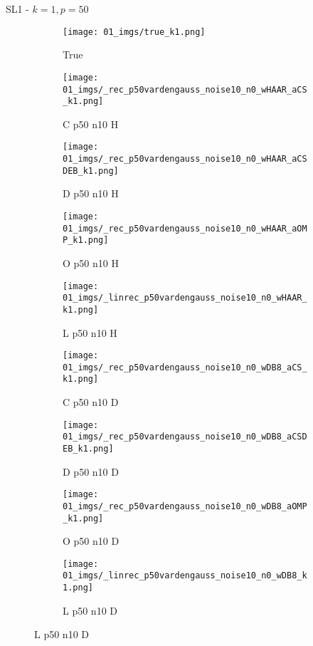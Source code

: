 \begin{frame}{SL1 - $k=1,p=50$}{}
\begin{figure}
\begin{subfigure}{0.1\textwidth}
\texttt{[image: 01\_imgs/true\_k1.png]}
\caption*{\Tiny True}
\end{subfigure}
\begin{subfigure}{0.1\textwidth}
\texttt{[image: 01\_imgs/\_rec\_p50vardengauss\_noise10\_n0\_wHAAR\_aCS\_k1.png]}
\caption*{\Tiny C p50 n10 H}
\end{subfigure}
\begin{subfigure}{0.1\textwidth}
\texttt{[image: 01\_imgs/\_rec\_p50vardengauss\_noise10\_n0\_wHAAR\_aCSDEB\_k1.png]}
\caption*{\Tiny D p50 n10 H}
\end{subfigure}
\begin{subfigure}{0.1\textwidth}
\texttt{[image: 01\_imgs/\_rec\_p50vardengauss\_noise10\_n0\_wHAAR\_aOMP\_k1.png]}
\caption*{\Tiny O p50 n10 H}
\end{subfigure}
\begin{subfigure}{0.1\textwidth}
\texttt{[image: 01\_imgs/\_linrec\_p50vardengauss\_noise10\_n0\_wHAAR\_k1.png]}
\caption*{\Tiny L p50 n10 H}
\end{subfigure}
\begin{subfigure}{0.1\textwidth}
\texttt{[image: 01\_imgs/\_rec\_p50vardengauss\_noise10\_n0\_wDB8\_aCS\_k1.png]}
\caption*{\Tiny C p50 n10 D}
\end{subfigure}
\begin{subfigure}{0.1\textwidth}
\texttt{[image: 01\_imgs/\_rec\_p50vardengauss\_noise10\_n0\_wDB8\_aCSDEB\_k1.png]}
\caption*{\Tiny D p50 n10 D}
\end{subfigure}
\begin{subfigure}{0.1\textwidth}
\texttt{[image: 01\_imgs/\_rec\_p50vardengauss\_noise10\_n0\_wDB8\_aOMP\_k1.png]}
\caption*{\Tiny O p50 n10 D}
\end{subfigure}
\begin{subfigure}{0.1\textwidth}
\texttt{[image: 01\_imgs/\_linrec\_p50vardengauss\_noise10\_n0\_wDB8\_k1.png]}
\caption*{\Tiny L p50 n10 D}
\end{subfigure}

\vspace{5pt}


\end{figure}
\end{frame}
